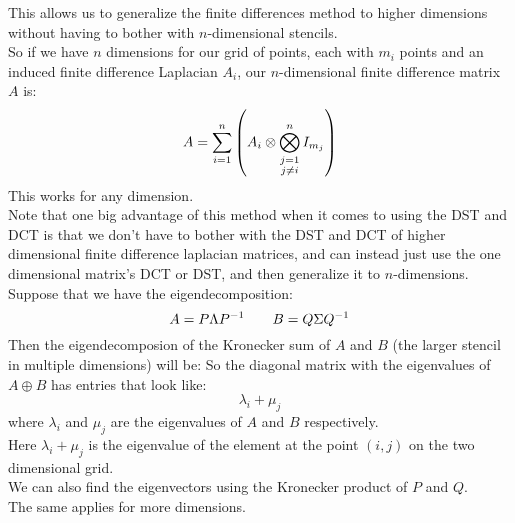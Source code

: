 \documentclass[12pt]{article}
\begin{document}
This allows us to generalize the finite differences
method to higher dimensions without having
to bother with $n$-dimensional stencils. \\
So if we have $n$ dimensions for our
grid of points, each with $m_i$
points and an induced finite difference
Laplacian $A_i$, our $n$-dimensional
finite difference matrix $A$ is:
\[ A = \sum_{i=1}^n \left( A_i \otimes 
\bigotimes_{\substack{j=1 \\ j \neq i}}^n I_{m_j} \right)  \]
This works for any dimension. \\

Note that one big advantage of this method
when it comes to using the DST and DCT is that
we don't have to bother with the DST and DCT
of higher dimensional finite difference laplacian 
matrices, and can instead just use the one 
dimensional  matrix's DCT or DST, and then 
generalize it to $n$-dimensions. \\

Suppose that we have the eigendecomposition:
\[ A = P\Lambda P^{-1} \qquad B = Q\Sigma Q^{-1} \]
Then the eigendecomposion of the Kronecker sum
of $A$ and $B$ (the larger stencil in multiple
dimensions) will be:
So the diagonal matrix with the eigenvalues
of $A \oplus B$ has entries that look like:
\[ \lambda_i + \mu_j \]
where $\lambda_i$ and $\mu_j$ are the eigenvalues of $A$
and $B$ respectively. \\
Here $\lambda_i + \mu_j$ is the eigenvalue of
the element at the point $(i, j)$ on the two dimensional
grid. \\

We can also find the eigenvectors using the Kronecker
product of $P$ and $Q$. \\

The same applies for more dimensions. \\


\newpage
\end{document}

